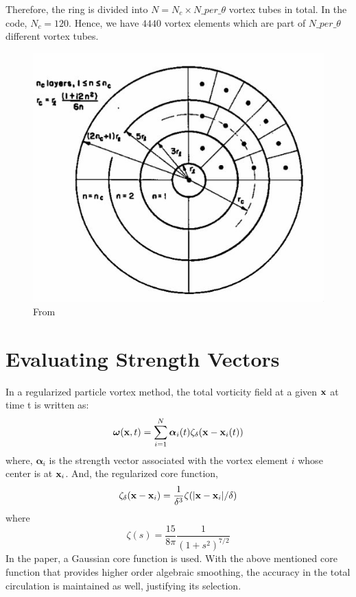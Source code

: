 \documentclass[10pt,a4paper]{report}
\newcommand{\omegav}{{\boldsymbol \omega}}
\newcommand{\xv}{{\bf x}}
\newcommand{\alphav}{{\boldsymbol \alpha}}
\begin{document}
Therefore, the ring is divided into $N = N_c \times N\_per\_\theta $ vortex tubes in total. In the code, $N_c = 120$. Hence, we have $4440$ vortex elements which are part of $N\_per\_\theta $ different vortex tubes.

\begin{figure}
\includegraphics[scale=0.4]{discrete.jpg}
\caption{From \cite{wincklemans} }
\end{figure}

\section{Evaluating Strength Vectors}
In a regularized particle vortex method, the total vorticity field at a given $\xv$ at time t is written as:
\begin{equation}
\omegav(\xv, t) = \sum_{i=1}^N \alphav_i(t) \zeta_\delta( \xv - \xv_i(t)) 
\label{pv}
\end{equation}
where, $ \alphav_i $ is the strength vector associated with the vortex element $i$ whose center is at $ \xv_i $.
And, the regularized core function,
\begin{equation}
\zeta_\delta (\xv - \xv_i) = \frac{1}{\delta^3} \zeta(|\xv - \xv_i|/\delta)
\end{equation}
where
\begin{equation}
\zeta(s) = \frac{15}{8 \pi} \frac{1}{\left(1 + s^2\right)^{7/2}} 
\end{equation}
In the paper\cite{ghoniem}, a Gaussian core function is used. With the above mentioned core function that provides higher order algebraic smoothing\cite{wincklemans}, the accuracy in the total circulation is maintained as well, justifying its selection. 
\end{document}
